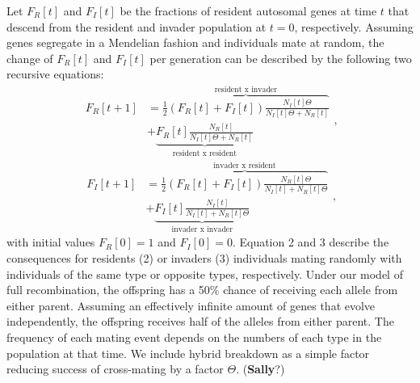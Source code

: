 \documentclass[a4paper,10pt]{article}
\begin{document}
	Let $F_R[t]$ and $F_I[t]$ be the fractions of resident autosomal genes at time $t$ that descend from the resident and invader population at $t=0$, respectively. Assuming genes segregate in a Mendelian fashion and individuals mate at random, the change of $F_R[t]$ and $F_I[t]$ per generation can be described by the following two recursive equations: 
	\begin{equation}
	\begin{split}
	F_R[t+1] & = \overbrace{\frac{1}{2} (F_R[t]+F_I[t]) \frac{N_I[t] \Theta }{N_I[t] \Theta +N_R[t]}}^\text{resident x invader} \\  
	& + \underbrace{F_R[t] \frac{N_R[t]}{N_I[t] \Theta +N_R[t]}}_\text{resident x resident}
	\end{split},
	\label{Eq FR}
	\end{equation}
	\begin{equation}
	\begin{split}
	F_I[t+1] &  = \overbrace{\frac{1}{2} (F_R[t]+F_I[t]) \frac{N_R[t] \Theta}{N_I[t]+N_R[t] \Theta}}^\text{invader x resident} \\
	& + \underbrace{F_I[t] \frac{N_I[t]}{N_I[t]+N_R[t] \Theta}}_\text{invader x invader}
	\end{split},
	\label{Eq FI}
	\end{equation}
	with initial values $F_R[0]=1$ and $F_I[0]=0$. Equation 2 and 3 describe the consequences for residents (2) or invaders (3) individuals mating randomly with individuals of the same type or opposite types, respectively. Under our model of full recombination, the offspring has a 50\% chance of receiving each allele from either parent. Assuming an effectively infinite amount of genes that evolve independently, the offspring receives half of the alleles from either parent. The frequency of each mating event depends on the numbers of each type in the population at that time. We include hybrid breakdown as a simple factor reducing success of cross-mating by a factor $\Theta$. (\textbf{Sally}?)
	
\end{document}
